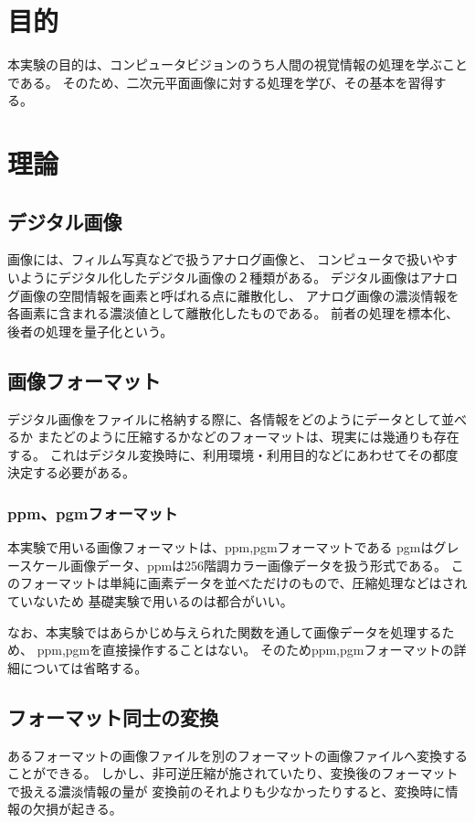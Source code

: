 \documentclass{jarticle}[2012/05/15]
\begin{document}
\section{目的}
本実験の目的は、コンピュータビジョンのうち人間の視覚情報の処理を学ぶことである。
そのため、二次元平面画像に対する処理を学び、その基本を習得する。
\par
\section{理論}
\subsection{デジタル画像}
画像には、フィルム写真などで扱うアナログ画像と、
コンピュータで扱いやすいようにデジタル化したデジタル画像の２種類がある。
デジタル画像はアナログ画像の空間情報を画素と呼ばれる点に離散化し、
アナログ画像の濃淡情報を各画素に含まれる濃淡値として離散化したものである。
前者の処理を標本化、後者の処理を量子化という。
\par
\subsection{画像フォーマット}
デジタル画像をファイルに格納する際に、各情報をどのようにデータとして並べるか
またどのように圧縮するかなどのフォーマットは、現実には幾通りも存在する。
これはデジタル変換時に、利用環境・利用目的などにあわせてその都度決定する必要がある。
\par
\subsubsection{ppm、pgmフォーマット}
本実験で用いる画像フォーマットは、ppm,pgmフォーマットである
pgmはグレースケール画像データ、ppmは256階調カラー画像データを扱う形式である。
このフォーマットは単純に画素データを並べただけのもので、圧縮処理などはされていないため
基礎実験で用いるのは都合がいい。
\par
なお、本実験ではあらかじめ与えられた関数を通して画像データを処理するため、
ppm,pgmを直接操作することはない。
そのためppm,pgmフォーマットの詳細については省略する。
\par
\subsection{フォーマット同士の変換}
あるフォーマットの画像ファイルを別のフォーマットの画像ファイルへ変換することができる。
しかし、非可逆圧縮が施されていたり、変換後のフォーマットで扱える濃淡情報の量が
変換前のそれよりも少なかったりすると、変換時に情報の欠損が起きる。
\par
\end{document}
